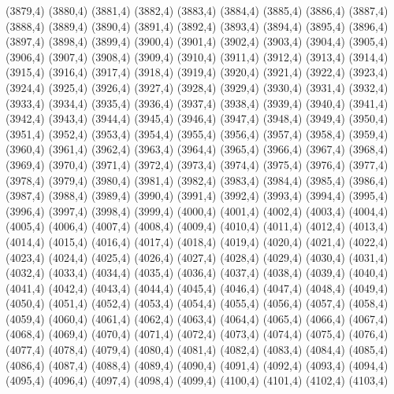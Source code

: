 (3879,4)
(3880,4)
(3881,4)
(3882,4)
(3883,4)
(3884,4)
(3885,4)
(3886,4)
(3887,4)
(3888,4)
(3889,4)
(3890,4)
(3891,4)
(3892,4)
(3893,4)
(3894,4)
(3895,4)
(3896,4)
(3897,4)
(3898,4)
(3899,4)
(3900,4)
(3901,4)
(3902,4)
(3903,4)
(3904,4)
(3905,4)
(3906,4)
(3907,4)
(3908,4)
(3909,4)
(3910,4)
(3911,4)
(3912,4)
(3913,4)
(3914,4)
(3915,4)
(3916,4)
(3917,4)
(3918,4)
(3919,4)
(3920,4)
(3921,4)
(3922,4)
(3923,4)
(3924,4)
(3925,4)
(3926,4)
(3927,4)
(3928,4)
(3929,4)
(3930,4)
(3931,4)
(3932,4)
(3933,4)
(3934,4)
(3935,4)
(3936,4)
(3937,4)
(3938,4)
(3939,4)
(3940,4)
(3941,4)
(3942,4)
(3943,4)
(3944,4)
(3945,4)
(3946,4)
(3947,4)
(3948,4)
(3949,4)
(3950,4)
(3951,4)
(3952,4)
(3953,4)
(3954,4)
(3955,4)
(3956,4)
(3957,4)
(3958,4)
(3959,4)
(3960,4)
(3961,4)
(3962,4)
(3963,4)
(3964,4)
(3965,4)
(3966,4)
(3967,4)
(3968,4)
(3969,4)
(3970,4)
(3971,4)
(3972,4)
(3973,4)
(3974,4)
(3975,4)
(3976,4)
(3977,4)
(3978,4)
(3979,4)
(3980,4)
(3981,4)
(3982,4)
(3983,4)
(3984,4)
(3985,4)
(3986,4)
(3987,4)
(3988,4)
(3989,4)
(3990,4)
(3991,4)
(3992,4)
(3993,4)
(3994,4)
(3995,4)
(3996,4)
(3997,4)
(3998,4)
(3999,4)
(4000,4)
(4001,4)
(4002,4)
(4003,4)
(4004,4)
(4005,4)
(4006,4)
(4007,4)
(4008,4)
(4009,4)
(4010,4)
(4011,4)
(4012,4)
(4013,4)
(4014,4)
(4015,4)
(4016,4)
(4017,4)
(4018,4)
(4019,4)
(4020,4)
(4021,4)
(4022,4)
(4023,4)
(4024,4)
(4025,4)
(4026,4)
(4027,4)
(4028,4)
(4029,4)
(4030,4)
(4031,4)
(4032,4)
(4033,4)
(4034,4)
(4035,4)
(4036,4)
(4037,4)
(4038,4)
(4039,4)
(4040,4)
(4041,4)
(4042,4)
(4043,4)
(4044,4)
(4045,4)
(4046,4)
(4047,4)
(4048,4)
(4049,4)
(4050,4)
(4051,4)
(4052,4)
(4053,4)
(4054,4)
(4055,4)
(4056,4)
(4057,4)
(4058,4)
(4059,4)
(4060,4)
(4061,4)
(4062,4)
(4063,4)
(4064,4)
(4065,4)
(4066,4)
(4067,4)
(4068,4)
(4069,4)
(4070,4)
(4071,4)
(4072,4)
(4073,4)
(4074,4)
(4075,4)
(4076,4)
(4077,4)
(4078,4)
(4079,4)
(4080,4)
(4081,4)
(4082,4)
(4083,4)
(4084,4)
(4085,4)
(4086,4)
(4087,4)
(4088,4)
(4089,4)
(4090,4)
(4091,4)
(4092,4)
(4093,4)
(4094,4)
(4095,4)
(4096,4)
(4097,4)
(4098,4)
(4099,4)
(4100,4)
(4101,4)
(4102,4)
(4103,4)
